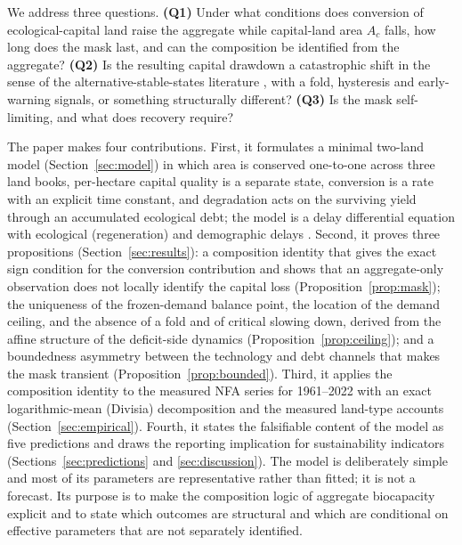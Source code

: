 \documentclass[preprint,12pt,authoryear]{elsarticle}
\begin{document}
We address three questions. \textbf{(Q1)} Under what conditions does conversion of ecological-capital land raise the aggregate while capital-land area $A_c$ falls, how long does the mask last, and can the composition be identified from the aggregate? \textbf{(Q2)} Is the resulting capital drawdown a catastrophic shift in the sense of the alternative-stable-states literature \citep{Scheffer2001}, with a fold, hysteresis and early-warning signals, or something structurally different? \textbf{(Q3)} Is the mask self-limiting, and what does recovery require?

The paper makes four contributions. First, it formulates a minimal two-land model (Section~\ref{sec:model}) in which area is conserved one-to-one across three land books, per-hectare capital quality is a separate state, conversion is a rate with an explicit time constant, and degradation acts on the surviving yield through an accumulated ecological debt; the model is a delay differential equation with ecological (regeneration) and demographic delays \citep{Kuang1993,Hutchinson1948}. Second, it proves three propositions (Section~\ref{sec:results}): a composition identity that gives the exact sign condition for the conversion contribution and shows that an aggregate-only observation does not locally identify the capital loss (Proposition~\ref{prop:mask}); the uniqueness of the frozen-demand balance point, the location of the demand ceiling, and the absence of a fold and of critical slowing down, derived from the affine structure of the deficit-side dynamics (Proposition~\ref{prop:ceiling}); and a boundedness asymmetry between the technology and debt channels that makes the mask transient (Proposition~\ref{prop:bounded}). Third, it applies the composition identity to the measured NFA series for 1961--2022 with an exact logarithmic-mean (Divisia) decomposition and the measured land-type accounts (Section~\ref{sec:empirical}). Fourth, it states the falsifiable content of the model as five predictions and draws the reporting implication for sustainability indicators (Sections~\ref{sec:predictions} and \ref{sec:discussion}). The model is deliberately simple and most of its parameters are representative rather than fitted; it is not a forecast. Its purpose is to make the composition logic of aggregate biocapacity explicit and to state which outcomes are structural and which are conditional on effective parameters that are not separately identified.
\end{document}
